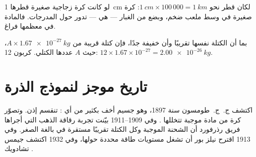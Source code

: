 \begin{example}\label{ex:g9:inside-the-atom:marble}
لو كانت   كرة زجاجية صغيرة قطرها \qty{1}{cm} لكان قطر  نحو
$\qty{1}{cm} \times 100\,000 = \qty{1}{km}$: كرة صغيرة في وسط ملعب ضخم،
وبضع  من الغبار --- هي  --- تدور حول المدرجات. فالمادة في
معظمها فراغ.
\end{example}

\begin{method}\label{met:g9:inside-the-atom:mass}
بما أن   الكتلة نفسها تقريبًا وأن  خفيفة
جدًا، فإن كتلة  قريبة من $A \times
\qty{1.67e-27}{kg}$، حيث $A$ عددها الكتلي.  كربون 12:
$12 \times 1.67 \times 10^{-27} = \qty{2.00e-26}{kg}$.
\end{method}

\section{تاريخ موجز لنموذج الذرة}

\begin{history}
اكتشف ج.~ج.~طومسون  سنة 1897، وهو جسيم أخف بكثير من أي :
 تنقسم إذن. وتصوّر  كرة من مادة موجبة تتخللها . وفي
1909--1911 بيّنت تجربة رقاقة الذهب التي أجراها فريق رذرفورد أن الشحنة
الموجبة وكل الكتلة تقريبًا مستقرة في  بالغة الصغر. وفي 1913 اقترح نيلز
بور أن  تشغل مستويات طاقة محددة حولها، وفي 1932 اكتشف جيمس
تشادويك .
\end{history}

